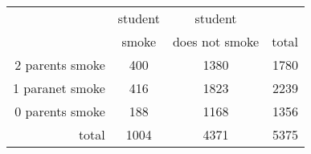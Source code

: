 \documentclass[a4paper,11pt]{article}
\begin{document}
\begin{table}
\begin{center}
\begin{tabular}{|r|c|c|r|}
			 & student & student & \\
       & smoke & does not smoke & total\\
      \hline
      2 parents smoke & 400 & 1380 & 1780\\
      1 paranet smoke & 416 & 1823 & 2239\\
      0 parents smoke & 188 & 1168 & 1356\\
      \hline
      total & 1004 & 4371 & 5375 \\
      
\end{tabular}
\end{center}
\end{table}
\end{document}
